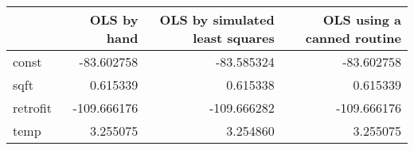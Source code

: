 \begin{tabular}{lrrr}
\toprule
{} &  OLS by hand &  OLS by simulated least squares &  OLS using a canned routine \\
\midrule
const    &   -83.602758 &                      -83.585324 &                  -83.602758 \\
sqft     &     0.615339 &                        0.615338 &                    0.615339 \\
retrofit &  -109.666176 &                     -109.666282 &                 -109.666176 \\
temp     &     3.255075 &                        3.254860 &                    3.255075 \\
\bottomrule
\end{tabular}
